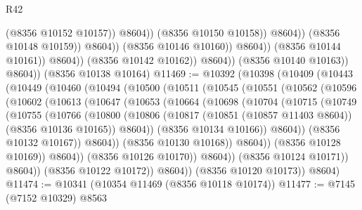 \begin{lexlean}{R42}
\begin{coremodule}
{                                              (@8356 @10152 @10157))
                                            @8604))
                                        (@8356 @10150 @10158))
                                      @8604))
                                  (@8356 @10148 @10159))
                                @8604))
                            (@8356 @10146 @10160))
                          @8604))
                      (@8356 @10144 @10161))
                    @8604))
                (@8356 @10142 @10162))
              @8604))
          (@8356 @10140 @10163))
        @8604))
    (@8356 @10138 @10164)
@11469 := @10392
    (@10398
      (@10409
        (@10443
          (@10449
            (@10460
              (@10494
                (@10500
                  (@10511
                    (@10545
                      (@10551
                        (@10562
                          (@10596
                            (@10602
                              (@10613
                                (@10647
                                  (@10653
                                    (@10664
                                      (@10698
                                        (@10704
                                          (@10715
                                            (@10749
                                              (@10755
                                                (@10766
                                                  (@10800
                                                    (@10806
                                                      (@10817
                                                        (@10851 (@10857 @11403 @8604))
                                                        (@8356 @10136 @10165))
                                                      @8604))
                                                  (@8356 @10134 @10166))
                                                @8604))
                                            (@8356 @10132 @10167))
                                          @8604))
                                      (@8356 @10130 @10168))
                                    @8604))
                                (@8356 @10128 @10169))
                              @8604))
                          (@8356 @10126 @10170))
                        @8604))
                    (@8356 @10124 @10171))
                  @8604))
              (@8356 @10122 @10172))
            @8604))
        (@8356 @10120 @10173))
      @8604)
@11474 := @10341 (@10354 @11469 (@8356 @10118 @10174))
@11477 := @7145 (@7152 @10329) @8563
}
\end{coremodule}
\end{lexlean}
